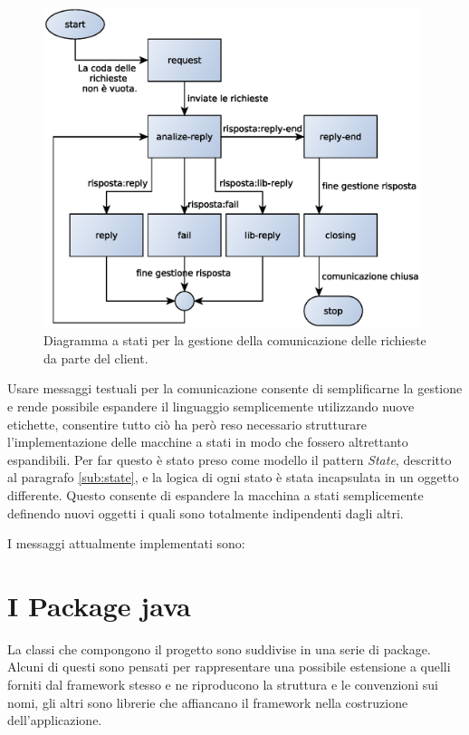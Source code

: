 \begin{figure}
\begin{center}
\includegraphics[width=11cm]{Immagini/StateMachineClient}
\caption{Diagramma a stati per la gestione della comunicazione delle richieste da parte del client.\label{f:stateclient}} 
\end{center} 
\end{figure}

Usare messaggi testuali per la comunicazione consente di semplificarne la gestione e rende possibile espandere il linguaggio semplicemente utilizzando nuove etichette, consentire tutto ci\`o ha per\`o reso necessario strutturare l'implementazione delle macchine a stati in modo che fossero altrettanto espandibili. Per far questo \`e stato preso come modello il pattern \textit{State}, descritto al paragrafo \ref{sub:state}, e la logica di ogni stato \`e stata incapsulata in un oggetto differente. Questo consente di espandere la macchina a stati semplicemente definendo nuovi oggetti i quali sono totalmente indipendenti dagli altri.



I messaggi attualmente implementati sono:





\section{I Package java} 
\label{sec:sfrc_packages}
La classi che compongono il progetto sono suddivise in una serie di package. %
Alcuni di questi sono pensati per rappresentare una possibile estensione a quelli forniti dal framework stesso e ne riproducono la struttura e le convenzioni sui nomi, gli altri sono librerie che affiancano il framework nella costruzione dell'applicazione.

